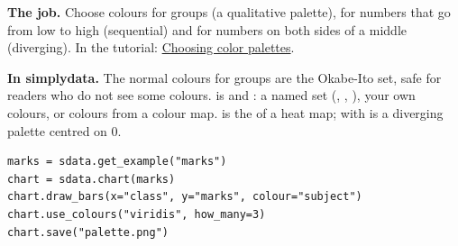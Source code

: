 
\textbf{The job.} Choose colours for groups (a qualitative palette), for numbers that go from low to
high (sequential) and for numbers on both sides of a middle (diverging). In the tutorial:
\href{https://seaborn.pydata.org/tutorial/color_palettes.html}{Choosing color palettes}.

\textbf{In simplydata.} The normal colours for groups are the Okabe-Ito set, safe for readers who do
not see some colours.  is  and : a named set
(, , ), your own colours, or  colours
from a colour map.  is the  of a heat map; 
with  is a diverging palette centred on 0.

\begin{lstlisting}[style=py]
marks = sdata.get_example("marks")
chart = sdata.chart(marks)
chart.draw_bars(x="class", y="marks", colour="subject")
chart.use_colours("viridis", how_many=3)
chart.save("palette.png")
\end{lstlisting}


